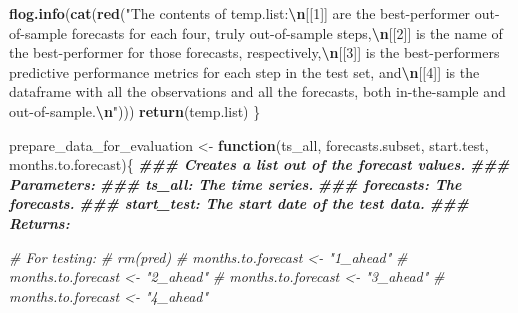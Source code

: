 \documentclass[
]{article}
\newenvironment{Shaded}{\begin{snugshade}}{\end{snugshade}}
\newcommand{\CommentTok}[1]{\textcolor[rgb]{0.56,0.35,0.01}{\textit{#1}}}
\newcommand{\ControlFlowTok}[1]{\textcolor[rgb]{0.13,0.29,0.53}{\textbf{#1}}}
\newcommand{\DocumentationTok}[1]{\textcolor[rgb]{0.56,0.35,0.01}{\textbf{\textit{#1}}}}
\newcommand{\FunctionTok}[1]{\textcolor[rgb]{0.13,0.29,0.53}{\textbf{#1}}}
\newcommand{\NormalTok}[1]{#1}
\newcommand{\OtherTok}[1]{\textcolor[rgb]{0.56,0.35,0.01}{#1}}
\newcommand{\SpecialCharTok}[1]{\textcolor[rgb]{0.81,0.36,0.00}{\textbf{#1}}}
\newcommand{\StringTok}[1]{\textcolor[rgb]{0.31,0.60,0.02}{#1}}
\begin{document}
\begin{Shaded}
\begin{Highlighting}[]
  \FunctionTok{flog.info}\NormalTok{(}\FunctionTok{cat}\NormalTok{(}\FunctionTok{red}\NormalTok{(}\StringTok{"The contents of temp.list:}\SpecialCharTok{\textbackslash{}n}\StringTok{[[1]] are the \textquotesingle{}best{-}performer out{-}of{-}sample forecasts\textquotesingle{} for each four, truly out{-}of{-}sample steps,}\SpecialCharTok{\textbackslash{}n}\StringTok{[[2]] is the name of the \textquotesingle{}best{-}performer\textquotesingle{} for those forecasts, respectively,}\SpecialCharTok{\textbackslash{}n}\StringTok{[[3]] is the \textquotesingle{}best{-}performer\textquotesingle{}s\textquotesingle{} predictive performance metrics for each step in the test set, and}\SpecialCharTok{\textbackslash{}n}\StringTok{[[4]] is the dataframe with all the observations and all the forecasts, both in{-}the{-}sample and out{-}of{-}sample.}\SpecialCharTok{\textbackslash{}n}\StringTok{"}\NormalTok{)))}
  \FunctionTok{return}\NormalTok{(temp.list)}
\NormalTok{\}}

\NormalTok{prepare\_data\_for\_evaluation }\OtherTok{\textless{}{-}} \ControlFlowTok{function}\NormalTok{(ts\_all, forecasts.subset, start.test, months.to.forecast)\{}
\DocumentationTok{\#\#\# Creates a list out of the forecast values.}
\DocumentationTok{\#\#\# Parameters:}
\DocumentationTok{\#\#\# ts\_all: The time series.}
\DocumentationTok{\#\#\# forecasts: The forecasts.}
\DocumentationTok{\#\#\# start\_test: The start date of the test data.}
\DocumentationTok{\#\#\# Returns:}

\CommentTok{\# For testing:}
\CommentTok{\# rm(pred)}
\CommentTok{\# months.to.forecast \textless{}{-} "1\_ahead"}
\CommentTok{\# months.to.forecast \textless{}{-} "2\_ahead"}
\CommentTok{\# months.to.forecast \textless{}{-} "3\_ahead"}
\CommentTok{\# months.to.forecast \textless{}{-} "4\_ahead"}


\end{Highlighting}
\end{Shaded}
\end{document}
